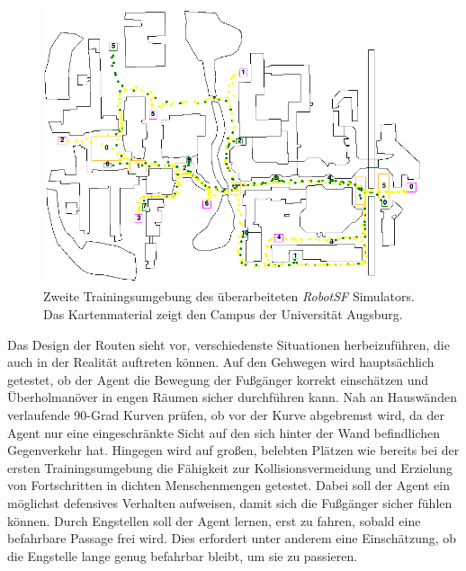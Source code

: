 \begin{figure}[h]
  \centering
  \includegraphics[width = 1.0\textwidth]{imgs/campus_map}
  \caption{Zweite Trainingsumgebung des überarbeiteten \emph{RobotSF} Simulators.
  Das Kartenmaterial zeigt den Campus der Universität Augsburg.}
  \label{fig:Scenario_2}
\end{figure}

Das Design der Routen sieht vor, verschiedenste Situationen herbeizuführen, die auch
in der Realität auftreten können. Auf den Gehwegen wird hauptsächlich getestet,
ob der Agent die Bewegung der Fußgänger korrekt einschätzen und Überholmanöver
in engen Räumen sicher durchführen kann. Nah an Hauswänden verlaufende 90-Grad Kurven
prüfen, ob vor der Kurve abgebremst wird, da der Agent nur eine eingeschränkte Sicht
auf den sich hinter der Wand befindlichen Gegenverkehr hat. Hingegen wird auf großen,
belebten Plätzen wie bereits bei der ersten Trainingsumgebung die Fähigkeit zur
Kollisionsvermeidung und Erzielung von Fortschritten in dichten Menschenmengen getestet.
Dabei soll der Agent ein möglichst defensives Verhalten aufweisen, damit sich die Fußgänger
sicher fühlen können. Durch Engstellen soll der Agent lernen, erst zu fahren, sobald eine
befahrbare Passage frei wird. Dies erfordert unter anderem eine Einschätzung, ob die
Engstelle lange genug befahrbar bleibt, um sie zu passieren.
